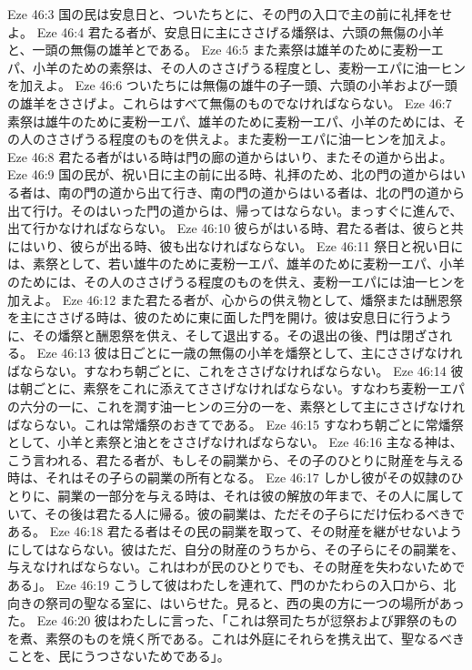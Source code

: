 Eze 46:3  国の民は安息日と、ついたちとに、その門の入口で主の前に礼拝をせよ。
Eze 46:4  君たる者が、安息日に主にささげる燔祭は、六頭の無傷の小羊と、一頭の無傷の雄羊とである。
Eze 46:5  また素祭は雄羊のために麦粉一エパ、小羊のための素祭は、その人のささげうる程度とし、麦粉一エパに油一ヒンを加えよ。
Eze 46:6  ついたちには無傷の雄牛の子一頭、六頭の小羊および一頭の雄羊をささげよ。これらはすべて無傷のものでなければならない。
Eze 46:7  素祭は雄牛のために麦粉一エパ、雄羊のために麦粉一エパ、小羊のためには、その人のささげうる程度のものを供えよ。また麦粉一エパに油一ヒンを加えよ。
Eze 46:8  君たる者がはいる時は門の廊の道からはいり、またその道から出よ。
Eze 46:9  国の民が、祝い日に主の前に出る時、礼拝のため、北の門の道からはいる者は、南の門の道から出て行き、南の門の道からはいる者は、北の門の道から出て行け。そのはいった門の道からは、帰ってはならない。まっすぐに進んで、出て行かなければならない。
Eze 46:10  彼らがはいる時、君たる者は、彼らと共にはいり、彼らが出る時、彼も出なければならない。
Eze 46:11  祭日と祝い日には、素祭として、若い雄牛のために麦粉一エパ、雄羊のために麦粉一エパ、小羊のためには、その人のささげうる程度のものを供え、麦粉一エパには油一ヒンを加えよ。
Eze 46:12  また君たる者が、心からの供え物として、燔祭または酬恩祭を主にささげる時は、彼のために東に面した門を開け。彼は安息日に行うように、その燔祭と酬恩祭を供え、そして退出する。その退出の後、門は閉ざされる。
Eze 46:13  彼は日ごとに一歳の無傷の小羊を燔祭として、主にささげなければならない。すなわち朝ごとに、これをささげなければならない。
Eze 46:14  彼は朝ごとに、素祭をこれに添えてささげなければならない。すなわち麦粉一エパの六分の一に、これを潤す油一ヒンの三分の一を、素祭として主にささげなければならない。これは常燔祭のおきてである。
Eze 46:15  すなわち朝ごとに常燔祭として、小羊と素祭と油とをささげなければならない。
Eze 46:16  主なる神は、こう言われる、君たる者が、もしその嗣業から、その子のひとりに財産を与える時は、それはその子らの嗣業の所有となる。
Eze 46:17  しかし彼がその奴隷のひとりに、嗣業の一部分を与える時は、それは彼の解放の年まで、その人に属していて、その後は君たる人に帰る。彼の嗣業は、ただその子らにだけ伝わるべきである。
Eze 46:18  君たる者はその民の嗣業を取って、その財産を継がせないようにしてはならない。彼はただ、自分の財産のうちから、その子らにその嗣業を、与えなければならない。これはわが民のひとりでも、その財産を失わないためである」。
Eze 46:19  こうして彼はわたしを連れて、門のかたわらの入口から、北向きの祭司の聖なる室に、はいらせた。見ると、西の奥の方に一つの場所があった。
Eze 46:20  彼はわたしに言った、「これは祭司たちが愆祭および罪祭のものを煮、素祭のものを焼く所である。これは外庭にそれらを携え出て、聖なるべきことを、民にうつさないためである」。
